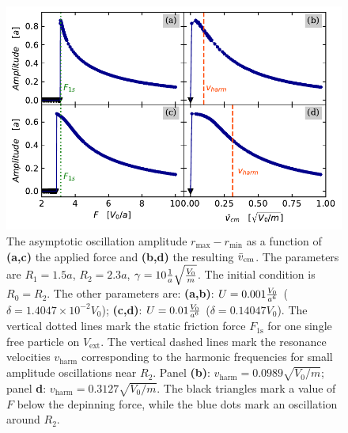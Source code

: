 \begin{figure}
\begin{center}
    \centering
    \includegraphics[width=1\linewidth]{Images/Resonance_2_a.pdf}
    \caption{The asymptotic oscillation amplitude $r_\text{max}-r_\text{min}$ as a function of \textbf{(a,c)} the applied force and \textbf{(b,d)} the resulting $\Bar{v}_\text{cm}$. The parameters are $R_1 = 1.5 a$, $R_2 = 2.3 a$, $\gamma = 10 \frac{1}{a}\sqrt{\frac{V_0}{m}}$. The initial condition is $R_0=R_2$. The other parameters are: \textbf{(a,b)}: $U = 0.001 \frac{V_0}{a^6}$ ($\delta = 1.4047 \times 10^{-2} V_0$); \textbf{(c,d)}: $U = 0.01 \frac{V_0}{a^6}$ ($\delta = 0.14047 V_0$). The vertical dotted lines mark the static friction force $F_\text{1s}$ for one single free particle on $V_\text{ext}$. The vertical dashed lines mark the resonance velocities $v_\text{harm}$ corresponding to the harmonic frequencies for small amplitude oscillations near $R_2$. Panel \textbf{(b)}: $v_\text{harm} = 0.0989 \sqrt{V_0/m}$; panel \textbf{d}: $v_\text{harm} =  0.3127 \sqrt{V_0/m}$. The black triangles mark a value of $F$ below the depinning force, while the blue dots mark an oscillation around $R_2$. }
    \label{Fig:Resonance_a}
\end{center}
\end{figure}



